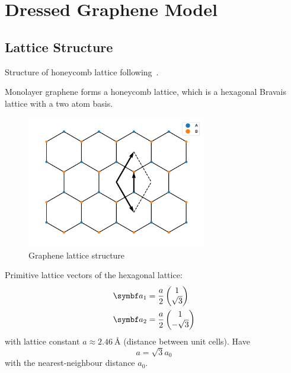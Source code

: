 \documentclass[../notes.tex]{subfiles}
\begin{document}
	
\chapter{Dressed Graphene Model}


\section{Lattice Structure}

Structure of honeycomb lattice following~\cite{yangStructureGrapheneIts2018}.

Monolayer graphene forms a honeycomb lattice, which is a hexagonal Bravais lattice with a two atom basis.

\begin{figure}[htb]
	\centering
	\includegraphics[width=0.7\textwidth]{images/graphene lattice}
	\caption{Graphene lattice structure}
	\label{fig:graphene lattice structure}
\end{figure}

Primitive lattice vectors of the hexagonal lattice:
\begin{align}
	\vb{a}_1 &= \frac{a}{2} \begin{pmatrix} 1 \\ \sqrt{3} \end{pmatrix} \\
	\vb{a}_2 &= \frac{a}{2} \begin{pmatrix} 1 \\ -\sqrt{3} \end{pmatrix}
\end{align}
with lattice constant \(a \approx \SI{2.46}{\angstrom}\) (distance between unit cells).
Have
\begin{equation}
	a = \sqrt{3} a_0
\end{equation}
with the nearest-neighbour distance \(a_0\).
\end{document}
